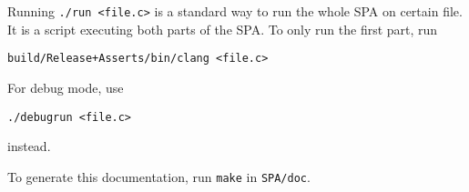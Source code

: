 Running \verb|./run <file.c>| is a standard way to run the whole SPA on certain file. It is a script executing both parts of the SPA. To only run the first part, run \begin{verbatim}build/Release+Asserts/bin/clang <file.c>\end{verbatim}
For debug mode, use \begin{verbatim}./debugrun <file.c>\end{verbatim} instead.

To generate this documentation, run \verb|make| in \verb|SPA/doc|.
